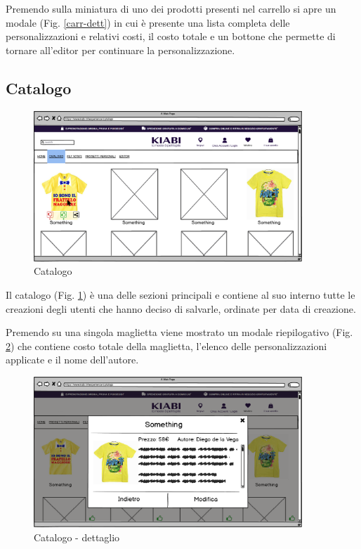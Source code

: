\documentclass[12pt,italian,]{report}
\begin{document}
Premendo sulla miniatura di uno dei prodotti presenti nel carrello si
apre un modale (Fig. \ref{carr-dett}) in cui è presente una lista completa delle
personalizzazioni e relativi costi, il costo totale e un bottone che
permette di tornare all'editor per continuare la personalizzazione.



\newpage
\hypertarget{catalogo}{%
\subsection{Catalogo}\label{catalogo}}

\begin{figure}[h]
\centering
\includegraphics[width=0.9\textwidth]{../balsamiq/balsamiq_finale/Catalogo.png}
\caption{Catalogo}
\label{catalogo}
\end{figure}

Il catalogo (Fig. \ref{catalogo}) è una delle sezioni principali e contiene al suo interno tutte le creazioni degli utenti che hanno deciso di salvarle, ordinate per data di creazione.

Premendo su una singola maglietta viene mostrato un modale riepilogativo (Fig. \ref{cat-dett})
che contiene costo totale della maglietta, l'elenco delle
personalizzazioni applicate e il nome dell'autore.

\begin{figure}[h]
\centering
\includegraphics[width=0.9\textwidth]{../balsamiq/balsamiq_finale/Catalogodetails.png}
\caption{Catalogo - dettaglio}
\label{cat-dett}
\end{figure}
\end{document}
